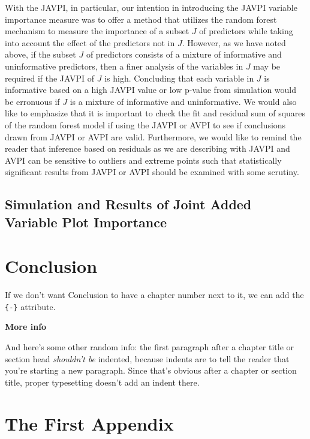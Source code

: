 \documentclass[12pt,twoside]{reedthesis}
\theoremstyle{definition}
\theoremstyle{definition}
\theoremstyle{definition}
\theoremstyle{remark}
\begin{document}
With the JAVPI, in particular, our intention in introducing the JAVPI
variable importance measure was to offer a method that utilizes the
random forest mechanism to measure the importance of a subset \(J\) of
predictors while taking into account the effect of the predictors not in
\(J\). However, as we have noted above, if the subset \(J\) of
predictors consists of a mixture of informative and uninformative
predictors, then a finer analysis of the variables in \(J\) may be
required if the JAVPI of \(J\) is high. Concluding that each variable in
\(J\) is informative based on a high JAVPI value or low p-value from
simulation would be erronuous if \(J\) is a mixture of informative and
uninformative. We would also like to emphasize that it is important to
check the fit and residual sum of squares of the random forest model if
using the JAVPI or AVPI to see if conclusions drawn from JAVPI or AVPI
are valid. Furthermore, we would like to remind the reader that
inference based on residuals as we are describing with JAVPI and AVPI
can be sensitive to outliers and extreme points such that statistically
significant results from JAVPI or AVPI should be examined with some
scrutiny.

\section{Simulation and Results of Joint Added Variable Plot
Importance}\label{simulation-and-results-of-joint-added-variable-plot-importance}

\chapter*{Conclusion}\label{conclusion}

If we don't want Conclusion to have a chapter number next to it, we can
add the \texttt{\{-\}} attribute.

\textbf{More info}

And here's some other random info: the first paragraph after a chapter
title or section head \emph{shouldn't be} indented, because indents are
to tell the reader that you're starting a new paragraph. Since that's
obvious after a chapter or section title, proper typesetting doesn't add
an indent there.

\appendix

\chapter{The First Appendix}\label{the-first-appendix}
\end{document}
